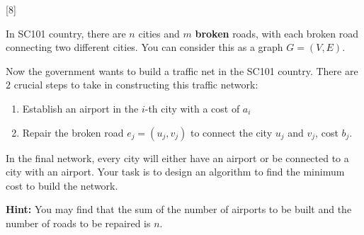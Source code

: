 [8]

In SC101 country, there are $n$ cities and $m$ \textbf{broken} roads, with each broken road connecting two different cities. You can consider this as a graph $G=(V, E)$. 

Now the government wants to build a traffic net in the SC101 country. There are $2$ crucial steps to take in constructing this traffic network:
\begin{enumerate}
    \item Establish an airport in the $i$-th city with a cost of $a_i$
    \item Repair the broken road $e_j = (u_j, v_j)$ to connect the city $u_j$ and $v_j$, cost $b_j$.
\end{enumerate}
In the final network, every city will either have an airport or be connected to a city with an airport. Your task is to design an algorithm to find the minimum cost to build the network.

\textbf{Hint:} You may find that the sum of the number of airports to be built and the number of roads to be repaired is $n$. 

\begin{solution}
\\
\\
\\
\\
\\
\\
\\
\\
\\
\\
\\
\\
\\
\\
\\
\\
\\
\\
\\
\\
\\
\\
\\
\\
\\
\\

    
\end{solution}